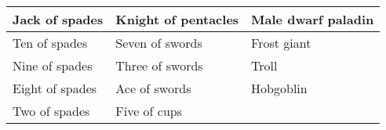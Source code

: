 \begin{longtable}{llllll}
{\begin{minipage}[t]{1.102in}
Jack of spades\end{minipage}} & \multicolumn{1}{p{1.207in}|}{\begin{minipage}[t]{1.207in}\raggedright
Knight of pentacles\end{minipage}} & \multicolumn{4}{p{2.191in}|}{\begin{minipage}[t]{2.191in}\raggedright
Male dwarf paladin\end{minipage}}\\
\hline
\multicolumn{1}{|p{1.102in}|}{\begin{minipage}[t]{1.102in}\raggedright
Ten of spades\end{minipage}} & \multicolumn{1}{p{1.207in}|}{\begin{minipage}[t]{1.207in}\raggedright
Seven of swords\end{minipage}} & \multicolumn{4}{p{2.191in}|}{\begin{minipage}[t]{2.191in}\raggedright
Frost giant\end{minipage}}\\
\hline
\multicolumn{1}{|p{1.102in}|}{\begin{minipage}[t]{1.102in}\raggedright
Nine of spades\end{minipage}} & \multicolumn{1}{p{1.207in}|}{\begin{minipage}[t]{1.207in}\raggedright
Three of swords\end{minipage}} & \multicolumn{4}{p{2.191in}|}{\begin{minipage}[t]{2.191in}\raggedright
Troll\end{minipage}}\\
\hline
\multicolumn{1}{|p{1.102in}|}{\begin{minipage}[t]{1.102in}\raggedright
Eight of spades\end{minipage}} & \multicolumn{1}{p{1.207in}|}{\begin{minipage}[t]{1.207in}\raggedright
Ace of swords\end{minipage}} & \multicolumn{4}{p{2.191in}|}{\begin{minipage}[t]{2.191in}\raggedright
Hobgoblin\end{minipage}}\\
\hline
\multicolumn{1}{|p{1.102in}|}{\begin{minipage}[t]{1.102in}\raggedright
Two of spades\end{minipage}} & \multicolumn{1}{p{1.207in}|}{\begin{minipage}[t]{1.207in}\raggedright
Five of cups\end{minipage}} & \multicolumn{4}{p{2.191in}|}{\begin{minipage}[t]{2.191in}\raggedright

\end{minipage}}
\end{longtable}
